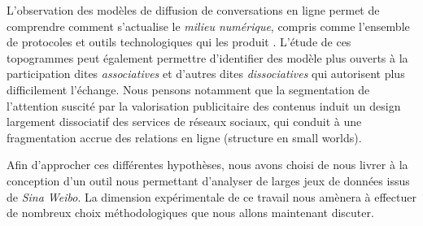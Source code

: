 L{\textquoteright}observation des modèles de diffusion de conversations en ligne permet de comprendre comment s'actualise le \textit{milieu numérique}, compris comme l{\textquoteright}ensemble de protocoles et outils technologiques qui les produit \citep{Hui2012}. L'étude de ces topogrammes peut également permettre d'identifier des modèle plus ouverts à la participation dites \textit{associatives }et d{\textquoteright}autres dites \textit{dissociatives} qui autorisent plus difficilement l{\textquoteright}échange. Nous pensons notamment que la segmentation de l{\textquoteright}attention suscité par la valorisation publicitaire des contenus induit un design largement dissociatif des services de réseaux sociaux, qui conduit à une fragmentation accrue des relations en ligne (structure en small worlds).

\bigskip

Afin d{\textquoteright}approcher ces différentes hypothèses, nous avons choisi de nous livrer à la conception d'un outil nous permettant d'analyser de larges jeux de données issus de \textit{Sina Weibo}. La dimension expérimentale de ce travail nous amènera à effectuer de nombreux choix méthodologiques que nous allons maintenant discuter.